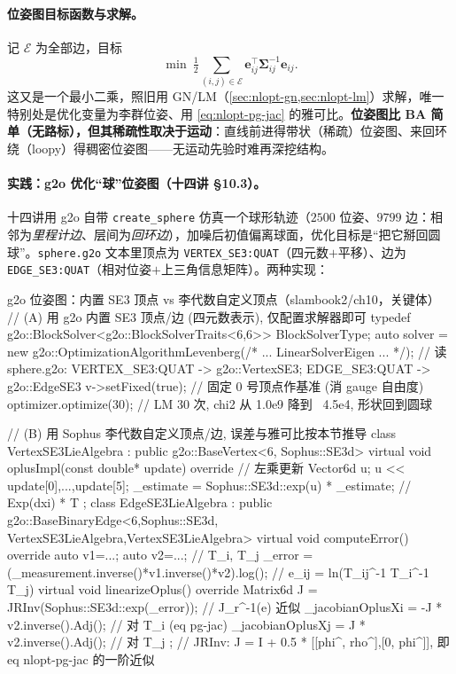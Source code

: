 \paragraph{位姿图目标函数与求解。}\cite{gaoxiang2019slam14}
记 $\mathcal{E}$ 为全部边，目标
\begin{equation}
  \min\ \tfrac12\sum_{(i,j)\in\mathcal{E}}\mathbf{e}_{ij}^\top\boldsymbol{\Sigma}_{ij}^{-1}\mathbf{e}_{ij}.
  \label{eq:nlopt-pg-cost}
\end{equation}
这又是一个最小二乘，照旧用 GN/LM（\cref{sec:nlopt-gn,sec:nlopt-lm}）求解，唯一特别处是优化变量为李群位姿、用 \cref{eq:nlopt-pg-jac} 的雅可比。\textbf{位姿图比 BA 简单（无路标），但其稀疏性取决于运动}：直线前进得带状（稀疏）位姿图、来回环绕（loopy）得稠密位姿图——无运动先验时难再深挖结构。

\paragraph{实践：g2o 优化“球”位姿图（十四讲 §10.3）。}\cite{gaoxiang2019slam14}
十四讲用 g2o 自带 \texttt{create\_sphere} 仿真一个球形轨迹（$2500$ 位姿、$9799$ 边：相邻为\emph{里程计边}、层间为\emph{回环边}），加噪后初值偏离球面，优化目标是“把它掰回圆球”。\texttt{sphere.g2o} 文本里顶点为 \texttt{VERTEX\_SE3:QUAT}（四元数$+$平移）、边为 \texttt{EDGE\_SE3:QUAT}（相对位姿$+$上三角信息矩阵）。两种实现：

\begin{codebox}[C++]{g2o 位姿图：内置 SE3 顶点 vs 李代数自定义顶点（slambook2/ch10，关键体）}
// (A) 用 g2o 内置 SE3 顶点/边 (四元数表示), 仅配置求解器即可
typedef g2o::BlockSolver<g2o::BlockSolverTraits<6,6>> BlockSolverType;
auto solver = new g2o::OptimizationAlgorithmLevenberg(/* ... LinearSolverEigen ... */);
// 读 sphere.g2o: VERTEX_SE3:QUAT -> g2o::VertexSE3; EDGE_SE3:QUAT -> g2o::EdgeSE3
v->setFixed(true);            // 固定 0 号顶点作基准 (消 gauge 自由度)
optimizer.optimize(30);       // LM 30 次, chi2 从 1.0e9 降到 ~4.5e4, 形状回到圆球

// (B) 用 Sophus 李代数自定义顶点/边, 误差与雅可比按本节推导
class VertexSE3LieAlgebra : public g2o::BaseVertex<6, Sophus::SE3d> {
  virtual void oplusImpl(const double* update) override {        // 左乘更新
    Vector6d u; u << update[0],...,update[5];
    _estimate = Sophus::SE3d::exp(u) * _estimate;                // Exp(dxi) * T
  }
};
class EdgeSE3LieAlgebra : public g2o::BaseBinaryEdge<6,Sophus::SE3d,
                              VertexSE3LieAlgebra,VertexSE3LieAlgebra> {
  virtual void computeError() override {
    auto v1=...; auto v2=...;                                    // T_i, T_j
    _error = (_measurement.inverse()*v1.inverse()*v2).log();     // e_ij = ln(T_ij^-1 T_i^-1 T_j)
  }
  virtual void linearizeOplus() override {
    Matrix6d J = JRInv(Sophus::SE3d::exp(_error));               // J_r^{-1}(e) 近似
    _jacobianOplusXi = -J * v2.inverse().Adj();                  // 对 T_i  (eq pg-jac)
    _jacobianOplusXj =  J * v2.inverse().Adj();                  // 对 T_j
  }
};
// JRInv: J = I + 0.5 * [[phi^, rho^],[0, phi^]], 即 eq nlopt-pg-jac 的一阶近似
\end{codebox}

